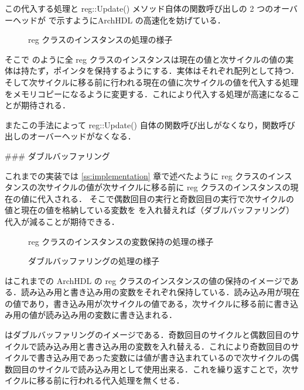この代入する処理と reg::Update() メソッド自体の関数呼び出しの
2 つのオーバーヘッドが で示すようにArchHDL の高速化を妨げている．

\begin{figure}[t]
 \begin{center}
  
 \end{center}
 \caption{ reg クラスのインスタンスの処理の様子}
 \label{fig:mem_copy}
\end{figure}


そこで のように全 reg クラスのインスタンスは現在の値と次サイクルの値の実体は持たず，ポインタを保持するようにする．実体はそれぞれ配列として持つ．そして次サイクルに移る前に行われる現在の値に次サイクルの値を代入する処理をメモリコピーになるように変更する．これにより代入する処理が高速になることが期待される．

またこの手法によって reg::Update() 自体の関数呼び出しがなくなり，関数呼び出しのオーバーヘッドがなくなる．


### ダブルバッファリング

これまでの実装では \ref{ss:implementation} 章で述べたように
reg クラスのインスタンスの次サイクルの値が次サイクルに移る前に reg クラスのインスタンスの現在の値に代入される．
そこで偶数回目の実行と奇数回目の実行で次サイクルの値と現在の値を格納している変数を
を入れ替えれば（ダブルバッファリング）代入が減ることが期待できる．

\begin{figure}[t]
 \begin{center}
  
 \end{center}
 \caption{reg クラスのインスタンスの変数保持の処理の様子}
 \label{fig:reg_curr_next}
\end{figure}

\begin{figure}[t]
 \begin{center}
  
 \end{center}
 \caption{ダブルバッファリングの処理の様子}
 \label{fig:double_buffer}
\end{figure}

 はこれまでの ArchHDL の reg クラスのインスタンスの値の保持のイメージである．読み込み用と書き込み用の変数をそれぞれ保持している．読み込み用が現在の値であり，書き込み用が次サイクルの値である，次サイクルに移る前に書き込み用の値が読み込み用の変数に書き込まれる．

 はダブルバッファリングのイメージである．奇数回目のサイクルと偶数回目のサイクルで読み込み用と書き込み用の変数を入れ替える．これにより奇数回目のサイクルで書き込み用であった変数には値が書き込まれているので次サイクルの偶数回目のサイクルで読み込み用として使用出来る．これを繰り返すことで，次サイクルに移る前に行われる代入処理を無くせる．

